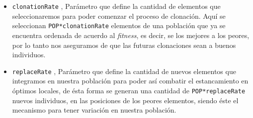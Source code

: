\begin{itemize}
	\item \texttt{clonationRate}   \blue{[0,1]}, Parámetro que define la cantidad de elementos que seleccionaremos
			para poder comenzar el proceso de clonación. Aquí se seleccionan \texttt{POP*clonationRate} elementos
			de una población que ya se encuentra ordenada de acuerdo al \emph{fitness}, es decir, se los mejores
			a los peores, por lo tanto nos aseguramos de que las futuras clonaciones sean a buenos individuos.

	\item \texttt{replaceRate}     \blue{[0,1]}, Parámetro que define la cantidad de nuevos elementos que
			integramos en nuestra población para poder así combatir el estancamiento en óptimos locales,
			de ésta forma se generan una cantidad de \texttt{POP*replaceRate} nuevos individuos, en las posiciones
			de los peores elementos, siendo éste el mecanismo para tener variación en nuestra población.

\end{itemize}
